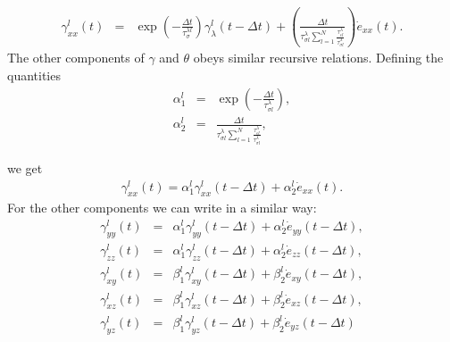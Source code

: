 \documentclass[11pt]{article}
\begin{document}
\begin{eqnarray}
\gamma^l_{xx}(t) & = &
            \exp(-\frac{\Delta t}{\tau^{\lambda l}_{\sigma}})
              \gamma^l_{\lambda}(t-\Delta t)
            +\left(\frac{\Delta t}{\tau^{\lambda}_{\sigma l}
            \sum_{l=1}^N\frac{\tau^{\lambda}_{\epsilon l}}
                             {\tau^{\lambda}_{\sigma l}}}\right)
             \dot{e}_{xx}(t). 
\end{eqnarray}
%
The other components of $\gamma$ and $\theta$ obeys similar recursive
relations.
Defining the quantities
\begin{eqnarray}
\alpha^l_1 & = & \exp(-\frac{\Delta t}{\tau^{\lambda}_{\sigma l}}), \nonumber\\
\alpha^l_2 & = & \frac{\Delta t}{\tau^{\lambda}_{\sigma l}
                 \sum_{l=1}^N\frac{\tau^{\lambda}_{\epsilon l}}
                                  {\tau^{\lambda}_{\sigma l}}} ,
\end{eqnarray}

%
we get
\begin{eqnarray}
\gamma^l_{xx}(t)   = \alpha^l_1 \gamma^l_{xx}(t-\Delta t) 
                        + \alpha^l_2\dot{e}_{xx}(t).
\end{eqnarray}
%
For the other components we can write in a similar way:
\begin{eqnarray}
\gamma^l_{yy}(t)  & = &\alpha^l_1 \gamma^l_{yy}(t-\Delta t) 
                        + \alpha^l_2\dot{e}_{yy}(t-\Delta t),\nonumber\\
\gamma^l_{zz}(t)  & = &\alpha^l_1 \gamma^l_{zz}(t-\Delta t) 
                        + \alpha^l_2\dot{e}_{zz}(t-\Delta t),\nonumber\\
\gamma^l_{xy}(t)  & = &\beta^l_1 \gamma^l_{xy}(t-\Delta t) 
                        + \beta^l_2\dot{e}_{xy}(t-\Delta t), \nonumber\\
\gamma^l_{xz}(t)  & = &\beta^l_1 \gamma^l_{xz}(t-\Delta t) 
                        + \beta^l_2\dot{e}_{xz}(t-\Delta t), \nonumber\\
\gamma^l_{yz}(t)  & = &\beta^l_1 \gamma^l_{yz}(t-\Delta t) 
                        + \beta^l_2\dot{e}_{yz}(t-\Delta t) \nonumber\\
\end{eqnarray}
\end{document}
